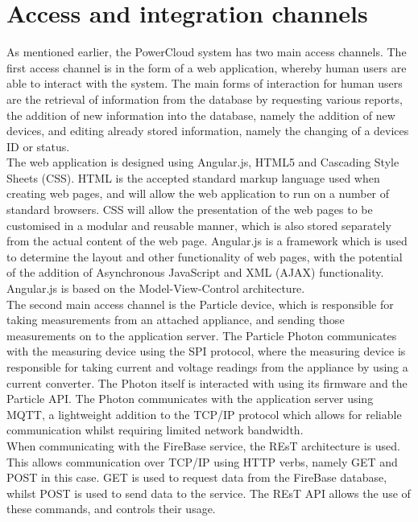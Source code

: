 \documentclass{article}
\begin{document}

\section{Access and integration channels}
	
	As mentioned earlier, the PowerCloud system has two main access 
	channels. The first access channel is in the form of a web 
	application, whereby human users are able to interact with the 
	system. The main forms of interaction for human users are the 
	retrieval of information from the database by requesting various 
	reports, the addition of new information into the database, namely 
	the addition of new devices, and editing already stored information, 
	namely the changing of a devices ID or status.\\
	
	The web application is designed using Angular.js, HTML5 and Cascading 
	Style Sheets (CSS). HTML is the accepted standard markup language 
	used when creating web pages, and will allow the web application to 
	run on a number of standard browsers. CSS will allow the presentation 
	of the web pages to be customised in a modular and reusable manner, 
	which is also stored separately from the actual content of the web 
	page. Angular.js is a framework which is used to determine the layout 
	and other functionality of web pages, with the potential of the 
	addition of Asynchronous JavaScript and XML (AJAX) functionality. 
	Angular.js is based on the Model-View-Control architecture.\\
	
	The second main access channel is the Particle device, which is 
	responsible for taking measurements from an attached appliance, and 
	sending those measurements on to the application server. The Particle 
	Photon communicates with the measuring device using the SPI protocol, 
	where the measuring device is responsible for taking current and 
	voltage readings from the appliance by using a current converter. The 
	Photon itself is interacted with using its firmware and the Particle 
	API. The Photon communicates with the application server using MQTT, 
	a lightweight addition to the TCP/IP protocol which allows for 
	reliable communication whilst requiring limited network bandwidth.\\
	
	When communicating with the FireBase service, the REsT architecture 
	is used. This allows communication over TCP/IP using HTTP verbs, 
	namely GET and POST in this case. GET is used to request data from 
	the FireBase database, whilst POST is used to send data to the 
	service. The REsT API allows the use of these commands, and controls 
	their usage.
\end{document}
